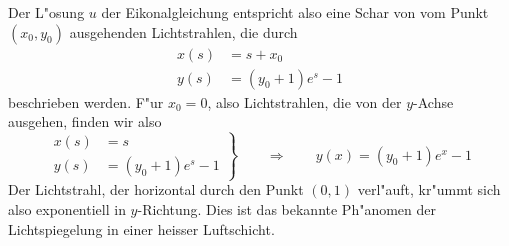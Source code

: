 {\begin{loesung}
Der L"osung $u$ der Eikonalgleichung entspricht also eine Schar
von
vom Punkt $(x_0,y_0)$ ausgehenden
Lichtstrahlen, die
durch
\begin{align*}
x(s)&=s+x_0\\
y(s)&=(y_0+1)e^s-1
\end{align*}
beschrieben werden. F"ur $x_0=0$, also Lichtstrahlen, die von der
$y$-Achse ausgehen, finden wir also
\begin{equation}
\left.
\begin{aligned}
x(s)&=s\\
y(s)&=(y_0+1)e^s-1
\end{aligned}
\right\}
\qquad\Rightarrow\qquad
y(x)=(y_0+1)e^x-1
\end{equation}
Der Lichtstrahl, der horizontal durch den Punkt $(0,1)$ verl"auft,
kr"ummt sich also exponentiell in $y$-Richtung.
Dies ist das bekannte Ph"anomen der Lichtspiegelung in einer
heisser Luftschicht.
\end{loesung}
}{}

